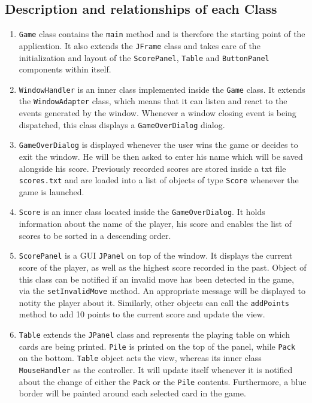 \documentclass[a4paper, 11pt, titlepage]{article}
\begin{document}
\subsection{Description and relationships of each Class}
\begin{enumerate}
	\item \texttt{Game} class contains the \texttt{main} method and is therefore the 
		starting point of the application. It also extends the \texttt{JFrame} class and 
		takes care of the initialization and layout of the \texttt{ScorePanel}, 
		\texttt{Table} and \texttt{ButtonPanel} components within itself.
		
	\item \texttt{WindowHandler} is an inner class implemented inside the \texttt{Game}
		class. It extends the \texttt{WindowAdapter} class, which means that it can 
		listen and react to the events generated by the window. Whenever a window closing 
		event is being dispatched, this class displays a \texttt{GameOverDialog} dialog.
		
	\item \texttt{GameOverDialog} is displayed whenever the user wins the game or decides to
		exit the window. He will be then asked to enter his name which will be saved
		alongside his score. Previously recorded scores are stored inside a txt file
		\texttt{scores.txt} and are loaded into a list of objects of type \texttt{Score}
		whenever the game is launched.
		
	\item \texttt{Score} is an inner class located inside the \texttt{GameOverDialog}. 
		It holds information about the name of the player, his score and enables the
		list of scores to be sorted in a descending order. 
		
	\item \texttt{ScorePanel} is a GUI \texttt{JPanel} on top of the window. It displays
		the current score of the player, as well as the highest score recorded in the 
		past. Object of this class can be notified if an invalid move has been detected 
		in the game, via the \texttt{setInvalidMove} method. An appropriate message will be 
		displayed to notity the player about it. Similarly, other objects can call 
		the \texttt{addPoints} method to add 10 points to the current score and update
		the view.
		
	\item \texttt{Table} extends the \texttt{JPanel} class and represents the playing 
		table on which cards are being printed. \texttt{Pile} is printed on the top of 
		the panel, while \texttt{Pack} on the bottom. \texttt{Table} object acts the 
		view, whereas its inner class \texttt{MouseHandler} as the controller. 
		It will update itself whenever it is notified about the change of
		either the \texttt{Pack} or the \texttt{Pile} contents. Furthermore, a blue border
		will be painted around each selected card in the game.
		

\end{enumerate}
\end{document}
